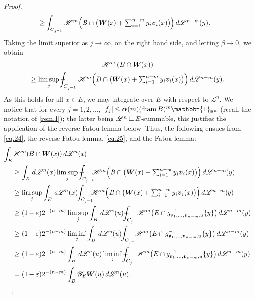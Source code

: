 \documentclass[JEP,XML,SOM,Unicode,ThmDefs,NoEqCountersInSection]{cedram}
\newcommand{\R}{\mathbb{R}}
\newcommand{\Rn}{\R^n}
\newcommand{\ind}{\mathbbm{1}}
\newcommand{\calH}{\mathscr{H}}
\newcommand{\calL}{\mathscr{L}}
\newcommand{\calY}{\mathscr{Y}}
\newcommand{\balpha}{\boldsymbol{\alpha}}
\newcommand{\bW}{{\boldsymbol{W}}}
\newcommand{\bv}{{\boldsymbol{v}}}
\DeclareMathOperator{\rmdiam}{\mathrm{diam}}
\newcommand{\hel} {
\hskip2.5pt{\vrule height7pt width.5pt depth0pt}
\hskip-.2pt\vbox{\hrule height.5pt width7pt depth0pt}
\,}
\def\Xint#1{\mathchoice
{\XXint\displaystyle\textstyle{#1}}{\XXint\textstyle\scriptstyle{#1}}{\XXint\scriptstyle\scriptscriptstyle{#1}}{\XXint\scriptscriptstyle
\scriptscriptstyle{#1}}\!\int}
\def\XXint#1#2#3{{\setbox0=\hbox{$#1{#2#3}{\int}$}
\vcenter{\hbox{$#2#3$}}\kern-.5\wd0}}
\def\dashint{\Xint-}
\let\veps\varepsilon
\begin{document}
\begin{proof}
\begin{equation*}
\begin{split}
& \geq \dashint_{C_{j^{-1}}}\textstyle\calH^m \Bigl(B \cap \bigl(\bW(x) + \sum_{i=1}^{n-m} y_i \bv_i(x) \bigr) \Bigr) \,d\calL^{n-m}(y).
\end{split}
\end{equation*}
Taking the limit superior as $j \to \infty$, on the right hand side, and letting $\beta \to 0$, we obtain
\begin{multline}
\label{eq.24}
\calH^m \left(B \cap \bW(x) \right)\\
\geq \limsup_j \dashint_{C_{j^{-1}}}\textstyle\calH^m \Bigl(B \cap \bigl(\bW(x) + \sum_{i=1}^{n-m} y_i \bv_i(x) \bigr) \Bigr) \,d\calL^{n-m}(y).
\end{multline}
As this holds for all $x \in E$, we may integrate over $E$ with respect to $\calL^n$.
We notice that for every $j=1,2,\ldots$, $|f_j| \leq \balpha(m) (\rmdiam B)^m \ind_{\Rn}$ (recall the notation of \ref{rem.1}); the latter being $\calL^n \hel E$-summable, this justifies the application of the reverse Fatou lemma below.
Thus, the following ensues from \eqref{eq.24}, the reverse Fatou lemma, \eqref{eq.25}, and the Fatou lemma:
\begin{align*}
\int_E &\calH^m(B \cap \bW(x)) \,d\calL^n(x) \\& \geq \int_E \,d\calL^n(x) \limsup_j \dashint_{C_{j^{-1}}}\hspace*{-2mm}\textstyle\calH^m \Bigl(B \cap \bigl(\bW(x) + \sum_{i=1}^{n-m} y_i \bv_i(x) \bigr) \Bigr) \,d\calL^{n-m}(y) \\
& \geq \limsup_j \int_E \,d\calL^n(x)\dashint_{C_{j^{-1}}}\hspace*{-2mm}\textstyle\calH^m \Bigl(B \cap \bigl(\bW(x) + \sum_{i=1}^{n-m} y_i \bv_i(x) \bigr) \Bigr) \,d\calL^{n-m}(y) \\
& \geq (1-\veps) 2^{-(n-m)} \limsup_j \int_B \,d\calL^n(u) \dashint_{C_{j^{-1}}} \hspace*{-2mm}\calH^m \bigl(E \cap g_{\bv_1,\ldots,\bv_{n-m},u}^{-1}\{y\} \bigr)\,d\calL^{n-m}(y)\\
& \geq (1-\veps) 2^{-(n-m)} \liminf_j \int_B \,d\calL^n(u) \dashint_{C_{j^{-1}}} \hspace*{-2mm}\calH^m \bigl(E \cap g_{\bv_1,\ldots,\bv_{n-m},u}^{-1}\{y\} \bigr)\,d\calL^{n-m}(y)\\
& \geq (1-\veps) 2^{-(n-m)} \int_B \,d\calL^n(u)\liminf_j \dashint_{C_{j^{-1}}} \hspace*{-2mm}\calH^m \bigl(E \cap g_{\bv_1,\ldots,\bv_{n-m},u}^{-1}\{y\} \bigr)\,d\calL^{n-m}(y)\\
&= (1-\veps) 2^{-(n-m)}\int_B \calY_E \bW(u)\,d\calL^n(u).\qedhere
\end{align*}
\end{proof}
\end{document}
